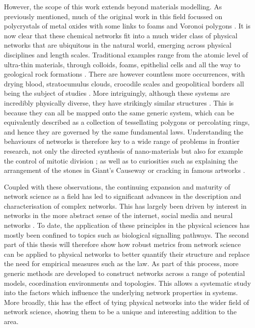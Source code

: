 However, the scope of this work extends beyond materials modelling.
As previously mentioned, much of the original work in this field focussed on polycrystals of metal oxides with some links to foams and Voronoi polygons \cite{Aboav1980,Boots1984}.
It is now clear that these chemical networks fit into a much wider class of \td{} physical networks that are ubiquitous in the natural world, emerging across physical disciplines and length scales.
Traditional examples range from the atomic level of ultra\--thin materials, through colloids, foams, epithelial cells and all the way to geological rock formations \cite{Earnshaw1994,Allain1995,Moncho-Jorda2000,Durand2011,Tong2017,Goehring2014}.
There are however countless more occurrences, with drying blood, stratocumulus clouds, crocodile scales and geopolitical borders all being the subject of studies \cite{Brutin2011,Glassmeier2017,Milinkovitch2019,LeCaer1993}.
More intriguingly, although these systems are incredibly physically diverse, they have strikingly similar structures \cite{Schliecker1999}. 
This is because they can all be mapped onto the same generic system, which can be equivalently described as a collection of tessellating polygons or percolating rings, and hence they are governed by the same fundamental laws. 
Understanding the behaviours of \td{} networks is therefore key to a wide range of problems in frontier research, not only the directed synthesis of nano\--materials but also for example the control of mitotic division \cite{Gibson2011,Ladan2019}; as well as to curiosities such as explaining the arrangement of the stones in Giant's Causeway or cracking in famous artworks \cite{Weaire1984,Flores2017}.

Coupled with these observations, the continuing expansion and maturity of network science as a field has led to significant advances in the description and characterisation of complex networks.
This has largely been driven by interest in networks in the more abstract sense of the internet, social media and neural networks \cite{Strogatz2001,Boccaletti2006,Barabasi2012}.
To date, the application of these principles in the physical sciences has mostly been confined to topics such as biological signalling pathways.
The second part of this thesis will therefore show how robust metrics from network science can be applied to physical \td{} networks to better quantify their structure and replace the need for empirical measures such as the \aw{} law.
As part of this process, more generic methods are developed to construct \td{} networks across a range of potential models, coordination environments and topologies.
This allows a systematic study into the factors which influence the underlying network properties in \td{} systems.
More broadly, this has the effect of tying physical \td{} networks into the wider field of network science, showing them to be a unique and interesting addition to the area.

